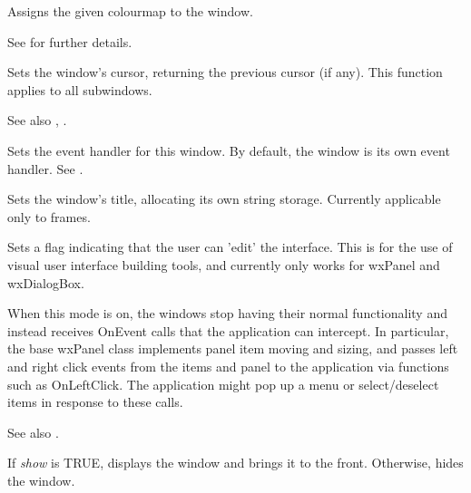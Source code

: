 Assigns the given colourmap to the window.

See  for further details.

\label{winsetcursor}


Sets the window's cursor, returning the previous cursor (if any). This
function applies to all subwindows.

See also , .

\label{wxwindowseteventhandler}


Sets the event handler for this window. By default, the window is its
own event handler. See .



Sets the window's title, allocating its own string storage. Currently
applicable only to frames.

\label{setusereditmode}


Sets a flag indicating that the user can 'edit' the interface.
This is for the use of visual user interface building tools, and
currently only works for wxPanel and wxDialogBox.

When this mode is on, the windows stop having their normal
functionality and instead receives OnEvent calls that the
application can intercept. In particular, the base wxPanel
class implements panel item moving and sizing, and
passes left and right click events from the items and panel
to the application via functions such as OnLeftClick.
The application might pop up a menu or select/deselect items
in response to these calls.

See also .



If {\it show} is TRUE, displays the window and brings it to the front.  Otherwise,
hides the window.

